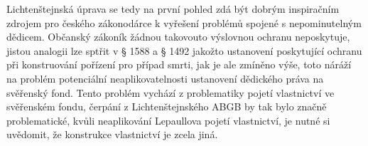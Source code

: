 \documentclass{article}
\begin{document}
Lichtenštejnská úprava se tedy na první pohled zdá být dobrým inspiračním zdrojem pro českého zákonodárce k vyřešení problémů spojené s nepominutelným dědicem. Občanský zákoník žádnou takovouto výslovnou ochranu neposkytuje, jistou analogii lze sptřit v § 1588 a § 1492 jakožto ustanovení poskytující ochranu při konstruování pořízení pro případ smrti, jak je ale zmíněno výše, toto náráží na problém potenciální neaplikovatelnosti ustanovení dědického práva na svěřenský fond. Tento problém vychází z problematiky pojetí vlastnictví ve svěřenském fondu, čerpání z Lichtenštejnského ABGB by tak bylo značně problematické, kvůli neaplikování Lepaullova pojetí vlastnictví, je nutné si uvědomit, že konstrukce vlastnictví je zcela jiná.\\

\end{document}
